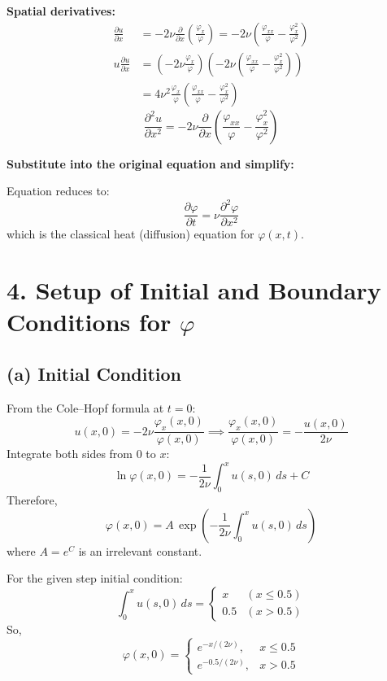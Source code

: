 \documentclass[12pt]{article}
\begin{document}
\textbf{Spatial derivatives:}
\begin{align*}
\frac{\partial u}{\partial x}
&= -2\nu \frac{\partial}{\partial x} \left( \frac{\varphi_x}{\varphi} \right )
= -2\nu \left( \frac{\varphi_{xx}}{\varphi} - \frac{\varphi_x^2}{\varphi^2} \right ) \\
u \frac{\partial u}{\partial x}
&= \left(-2\nu \frac{\varphi_x}{\varphi}\right) \left(-2\nu \left( \frac{\varphi_{xx}}{\varphi} - \frac{\varphi_x^2}{\varphi^2}\right)\right) \\
&= 4\nu^2 \frac{\varphi_x}{\varphi} \left( \frac{\varphi_{xx}}{\varphi} - \frac{\varphi_x^2}{\varphi^2} \right )
\end{align*}
\[
\frac{\partial^2 u}{\partial x^2}
= -2\nu \frac{\partial}{\partial x} \left( \frac{\varphi_{xx}}{\varphi} - \frac{\varphi_x^2}{\varphi^2} \right )
\]

\textbf{Substitute into the original equation and simplify:}

Equation reduces to:
\[
\boxed{
\frac{\partial \varphi}{\partial t} = \nu \frac{\partial^2 \varphi}{\partial x^2}
}
\]
which is the classical heat (diffusion) equation for $\varphi(x, t)$.

\section*{4. Setup of Initial and Boundary Conditions for $\varphi$}

\subsection*{(a) Initial Condition}

From the Cole--Hopf formula at $t = 0$:
\[
u(x,0) = -2\nu \frac{\varphi_x(x,0)}{\varphi(x,0)}
\implies \frac{\varphi_x(x,0)}{\varphi(x,0)} = -\frac{u(x,0)}{2\nu}
\]
Integrate both sides from $0$ to $x$:
\[
\ln \varphi(x,0) = -\frac{1}{2\nu} \int_0^x u(s,0)\,ds + C
\]
Therefore,
\[
\varphi(x, 0) = A\, \exp\left( -\frac{1}{2\nu} \int_0^x u(s, 0)\, ds \right )
\]
where $A = e^C$ is an irrelevant constant.

For the given step initial condition:
\[
\int_0^x u(s, 0)\, ds =
\begin{cases}
x & (x \le 0.5) \\
0.5 & (x > 0.5)
\end{cases}
\]
So,
\[
\boxed{
\varphi(x, 0) =
\begin{cases}
e^{-x/(2\nu)}, & x \leq 0.5 \\
e^{-0.5/(2\nu)}, & x > 0.5
\end{cases}
}
\]
\end{document}
